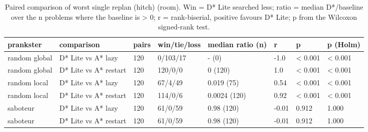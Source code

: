 \begin{table}[t]
\centering
\small
\caption{Paired comparison of worst single replan (hitch) (room). Win = D* Lite searched less; ratio = median D*/baseline over the n problems where the baseline is > 0; r = rank-biserial, positive favours D* Lite; p from the Wilcoxon signed-rank test.}
\label{tab:tests-hitch-room}
\begin{tabular}{llllllll}
\toprule
prankster & comparison & pairs & win/tie/loss & median ratio (n) & r & p & p (Holm) \\
\midrule
random global & D* Lite vs A* lazy & 120 & 0/103/17 & - (0) & -1.0 & < 0.001 & < 0.001 \\
random global & D* Lite vs A* restart & 120 & 120/0/0 & 0 (120) & 1.0 & < 0.001 & < 0.001 \\
random local & D* Lite vs A* lazy & 120 & 67/4/49 & 0.019 (75) & 0.54 & < 0.001 & < 0.001 \\
random local & D* Lite vs A* restart & 120 & 114/0/6 & 0.0024 (120) & 0.92 & < 0.001 & < 0.001 \\
saboteur & D* Lite vs A* lazy & 120 & 61/0/59 & 0.98 (120) & -0.01 & 0.912 & 1.000 \\
saboteur & D* Lite vs A* restart & 120 & 61/0/59 & 0.98 (120) & -0.01 & 0.912 & 1.000 \\
\bottomrule
\end{tabular}
\end{table}
